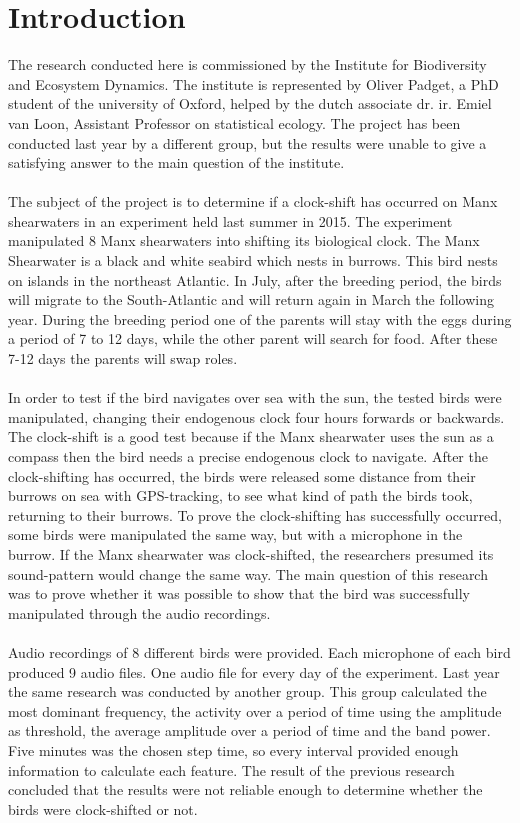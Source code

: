 \documentclass[a4paper]{article}
\begin{document}
\section*{Introduction}
The research conducted here is commissioned by the Institute for Biodiversity and Ecosystem Dynamics. The institute is represented by Oliver Padget, a PhD student of the university of Oxford, helped by the dutch associate dr. ir. Emiel van Loon, Assistant Professor on statistical ecology. The project has been conducted last year by a different group, but the results were unable to give a satisfying answer to the main question of the institute.\\ \\
The subject of the project is to determine if a clock-shift has occurred on Manx shearwaters in an experiment held last summer in 2015. The experiment manipulated 8 Manx shearwaters into shifting its biological clock. The Manx Shearwater is a black and white seabird which nests in burrows. This bird nests on islands in the northeast Atlantic. In July, after the breeding period, the birds will migrate to the South-Atlantic and will return again in March the following year. During the breeding period one of the parents will stay with the eggs during a period of 7 to 12 days, while the other parent will search for food. After these 7-12 days the parents will swap roles.\\ \\ 
In order to test if the bird navigates over sea with the sun, the tested birds were manipulated, changing their endogenous clock four hours forwards or backwards. The clock-shift is a good test because if the Manx shearwater uses the sun as a compass then the bird needs a precise endogenous clock to navigate. After the clock-shifting has occurred, the birds were released some distance from their burrows on sea with GPS-tracking, to see what kind of path the birds took, returning to their burrows. To prove the clock-shifting has successfully occurred, some birds were manipulated the same way, but with a microphone in the burrow. If the Manx shearwater was clock-shifted, the researchers presumed its sound-pattern would change the same way. The main question of this research was to prove whether it was possible to show that the bird was successfully manipulated through the audio recordings.\\ \\
Audio recordings of 8 different birds were provided. Each microphone of each bird produced 9 audio files. One audio file for every day of the experiment. Last year the same research was conducted by another group. This group calculated the most dominant frequency, the activity over a period of time using the amplitude as threshold, the average amplitude over a period of time and the band power. Five minutes was the chosen step time, so every interval provided enough information to calculate each feature. The result of the previous research concluded that the results were not reliable enough to determine whether the birds were clock-shifted or not.\\ \\
\end{document}
